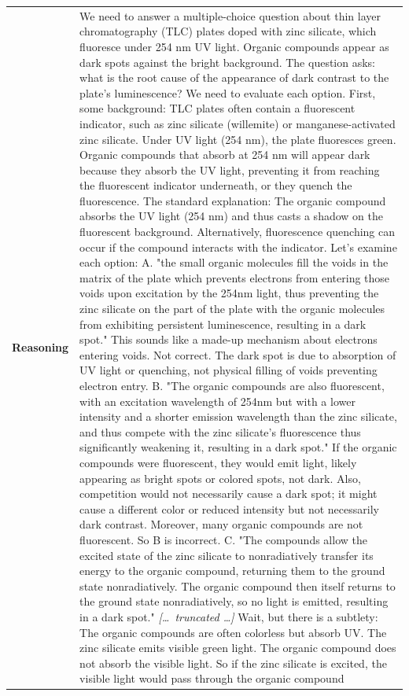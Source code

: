 \begin{longtable}{@{}l p{13cm}@{}}
  \textbf{Reasoning} & We need to answer a multiple-choice question about thin layer chromatography (TLC) plates doped with zinc silicate, which fluoresce under 254 nm UV light. Organic compounds appear as dark spots against the bright background. The question asks: what is the root cause of the appearance of dark contrast to the plate's luminescence? \newline We need to evaluate each option. \newline First, some background: TLC plates often contain a fluorescent indicator, such as zinc silicate (willemite) or manganese-activated zinc silicate. Under UV light (254 nm), the plate fluoresces green. Organic compounds that absorb at 254 nm will appear dark because they absorb the UV light, preventing it from reaching the fluorescent indicator underneath, or they quench the fluorescence. The standard explanation: The organic compound absorbs the UV light (254 nm) and thus casts a shadow on the fluorescent background. Alternatively, fluorescence quenching can occur if the compound interacts with the indicator. \newline Let's examine each option: \newline A. "the small organic molecules fill the voids in the matrix of the plate which prevents electrons from entering those voids upon excitation by the 254nm light, thus preventing the zinc silicate on the part of the plate with the organic molecules from exhibiting persistent luminescence, resulting in a dark spot." \newline This sounds like a made-up mechanism about electrons entering voids. Not correct. The dark spot is due to absorption of UV light or quenching, not physical filling of voids preventing electron entry. \newline B. "The organic compounds are also fluorescent, with an excitation wavelength of 254nm but with a lower intensity and a shorter emission wavelength than the zinc silicate, and thus compete with the zinc silicate's fluorescence thus significantly weakening it, resulting in a dark spot." \newline If the organic compounds were fluorescent, they would emit light, likely appearing as bright spots or colored spots, not dark. Also, competition would not necessarily cause a dark spot; it might cause a different color or reduced intensity but not necessarily dark contrast. Moreover, many organic compounds are not fluorescent. So B is incorrect. \newline C. "The compounds allow the excited state of the zinc silicate to nonradiatively transfer its energy to the organic compound, returning them to the ground state nonradiatively. The organic compound then itself returns to the ground state nonradiatively, so no light is emitted, resulting in a dark spot." \newline \textit{[\ldots\ truncated \ldots]} \newline Wait, but there is a subtlety: The organic compounds are often colorless but absorb UV. The zinc silicate emits visible green light. The organic compound does not absorb the visible light. So if the zinc silicate is excited, the visible light would pass through the organic compound 
\end{longtable}
